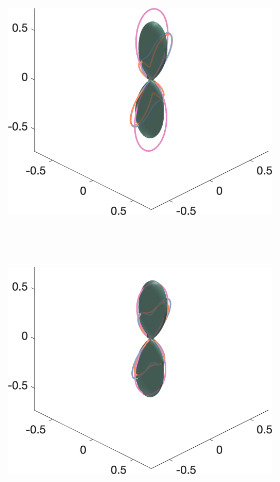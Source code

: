 \begin{figure}
  \centering
  \begin{subfigure}[]{\textwidth}
  \begin{subfigure}[]{0.32\textwidth}
    \includegraphics[width=\textwidth]{figures/frf_experiment/fibres_fod_3D_kappa2_b_1000n_4}
  \end{subfigure}
  ~
  \begin{subfigure}[]{0.32\textwidth}
    \includegraphics[width=\textwidth]{figures/frf_experiment/fibres_fod_3D_kappa2_b_2000n_4}
  \end{subfigure}
  ~
  \begin{subfigure}[]{0.32\textwidth}

\end{subfigure}
\end{subfigure}
\end{figure}
